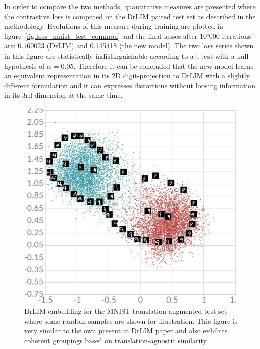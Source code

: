 \documentclass[a4paper,12pt]{report}
\begin{document}
In order to compare the two methods, quantitative measures are presented where the contrastive loss is computed on the DrLIM paired test set as described in the methodology.
Evolutions of this measure during training are plotted in figure~\ref{fig:loss_mnist_test_common} and the final losses after 10'000 iterations are: $0.160023$ (DrLIM) and 0.145418 (the new model).
The two loss series shown in this figure are statistically indistinguishable according to a t-test with a null hypothesis of $\alpha = 0.05$.
Therefore it can be concluded that the new model learns an equivalent representation in its 2D digit-projection to DrLIM with a slightly different formulation and it can expresses distortions without loosing information in its 3rd dimension at the same time.

\begin{figure}[h]
    \centering
    \includegraphics{thesis_figures/mnist_cl_drlim.jpg}
    \caption{DrLIM embedding for the MNIST translation-augmented test set where some random samples are shown for illustration.
    This figure is very similar to the own present in DrLIM paper and also exhibits coherent groupings based on translation-agnostic similarity.
    }
    \label{fig:mnist_cl_drlim}
\end{figure}
\end{document}
